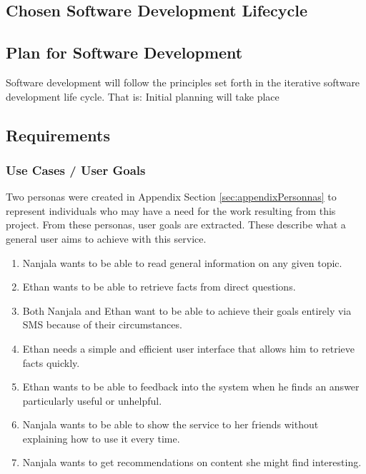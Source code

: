 \documentclass{article}
\begin{document}
\subsection{Chosen Software Development Lifecycle}

\subsection{Plan for Software Development}
Software development will follow the principles set forth in the iterative software development life cycle.  That is: Initial planning will take place 

\subsection{Requirements}

\subsubsection{Use Cases / User Goals}
Two personas were created in Appendix Section \ref{sec:appendixPersonnas} to represent individuals who may have a need for the work resulting from this project.  From these personas, user goals are extracted.  These describe what a general user aims to achieve with this service.
\begin{enumerate}
  \item Nanjala wants to be able to read general information on any given topic.
  \item Ethan wants to be able to retrieve facts from direct questions.
  \item Both Nanjala and Ethan want to be able to achieve their goals entirely via SMS because of their circumstances.
  \item Ethan needs a simple and efficient user interface that allows him to retrieve facts quickly. 
  \item Ethan wants to be able to feedback into the system when he finds an answer particularly useful or unhelpful. 
  \item Nanjala wants to be able to show the service to her friends without explaining how to use it every time.
  \item Nanjala wants to get recommendations on content she might find interesting. 
\end{enumerate}
\end{document}
